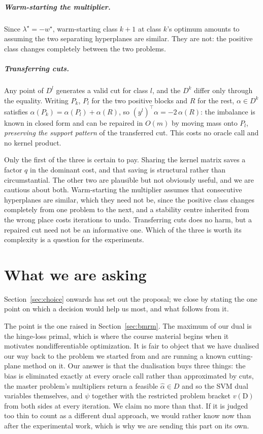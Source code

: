 \documentclass[11pt,a4paper]{report}
\begin{document}
\paragraph{Warm-starting the multiplier.} Since $\lambda^\star=-w^\star$,
warm-starting class $k{+}1$ at class $k$'s optimum amounts to assuming the two
separating hyperplanes are similar. They are not: the positive class changes
completely between the two problems.

\paragraph{Transferring cuts.} Any point of $D^l$ generates a valid cut for class
$l$, and the $D^k$ differ only through the equality. Writing $P_k$, $P_l$ for the two
positive blocks and $R$ for the rest, $\alpha\in D^k$ satisfies
$\alpha(P_k)=\alpha(P_l)+\alpha(R)$, so $(y^l)^{\!\top}\alpha=-2\,\alpha(R)$: the
imbalance is known in closed form and can be repaired in $O(m)$ by moving mass onto
$P_l$, \emph{preserving the support pattern} of the transferred cut. This costs no
oracle call and no kernel product.

Only the first of the three is certain to pay. Sharing the kernel matrix saves a
factor $q$ in the dominant cost, and that saving is structural rather than
circumstantial. The other two are plausible but not obviously useful, and we are
cautious about both. Warm-starting the multiplier assumes that consecutive
hyperplanes are similar, which they need not be, since the positive class changes
completely from one problem to the next, and a stability centre inherited from the
wrong place costs iterations to undo. Transferring cuts does no harm, but a repaired
cut need not be an informative one. Which of the three is worth its complexity is a
question for the experiments.

\chapter{What we are asking}
\label{ch:ask}

Section~\ref{sec:choice} onwards has set out the proposal; we close by stating the
one point on which a decision would help us most, and what follows from it.

The point is the one raised in Section~\ref{sec:bmrm}. The maximum of our dual is the
hinge-loss primal, which is where the course material begins when it motivates
nondifferentiable optimization. It is fair to object that we have dualised our way
back to the problem we started from and are running a known cutting-plane method on
it. Our answer is that the dualisation buys three things: the bias is eliminated
exactly at every oracle call rather than approximated by cuts, the master problem's
multipliers return a feasible $\hat\alpha\in D$ and so the SVM dual variables
themselves, and $\psi$ together with the restricted problem bracket $v(\mathrm{D})$
from both sides at every iteration. We claim no more than that. If it is judged too
thin to count as a different dual approach, we would rather know now than after the
experimental work, which is why we are sending this part on its own.
\end{document}
